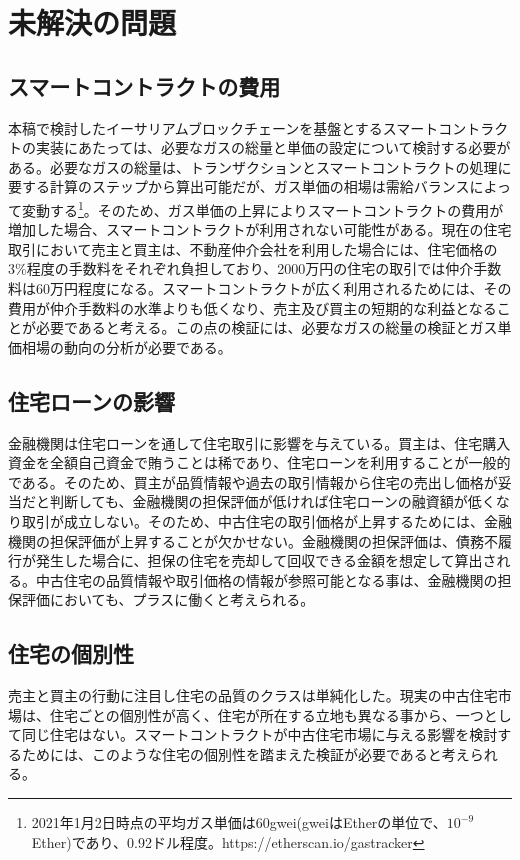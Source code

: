 \documentclass[a4paper,fontsize=11pt,report,notitlepage,line_length=38zw,number_of_lines=40,dvipdfmx]{jlreq}
\begin{document}
\section{未解決の問題}
\subsection{スマートコントラクトの費用}
本稿で検討したイーサリアムブロックチェーンを基盤とするスマートコントラクトの実装にあたっては、必要なガスの総量と単価の設定について検討する必要がある。必要なガスの総量は、トランザクションとスマートコントラクトの処理に要する計算のステップから算出可能だが、ガス単価の相場は需給バランスによって変動する\footnote{2021年1月2日時点の平均ガス単価は60gwei(gweiはEtherの単位で、$10^{-9}$Ether)であり、0.92ドル程度。https://etherscan.io/gastracker}。そのため、ガス単価の上昇によりスマートコントラクトの費用が増加した場合、スマートコントラクトが利用されない可能性がある。現在の住宅取引において売主と買主は、不動産仲介会社を利用した場合には、住宅価格の3\%程度の手数料をそれぞれ負担しており、2000万円の住宅の取引では仲介手数料は60万円程度になる。スマートコントラクトが広く利用されるためには、その費用が仲介手数料の水準よりも低くなり、売主及び買主の短期的な利益となることが必要であると考える。この点の検証には、必要なガスの総量の検証とガス単価相場の動向の分析が必要である。

\subsection{住宅ローンの影響}
金融機関は住宅ローンを通して住宅取引に影響を与えている。買主は、住宅購入資金を全額自己資金で賄うことは稀であり、住宅ローンを利用することが一般的である。そのため、買主が品質情報や過去の取引情報から住宅の売出し価格が妥当だと判断しても、金融機関の担保評価が低ければ住宅ローンの融資額が低くなり取引が成立しない。そのため、中古住宅の取引価格が上昇するためには、金融機関の担保評価が上昇することが欠かせない。金融機関の担保評価は、債務不履行が発生した場合に、担保の住宅を売却して回収できる金額を想定して算出される。中古住宅の品質情報や取引価格の情報が参照可能となる事は、金融機関の担保評価においても、プラスに働くと考えられる。

\subsection{住宅の個別性}
売主と買主の行動に注目し住宅の品質のクラスは単純化した。現実の中古住宅市場は、住宅ごとの個別性が高く、住宅が所在する立地も異なる事から、一つとして同じ住宅はない。スマートコントラクトが中古住宅市場に与える影響を検討するためには、このような住宅の個別性を踏まえた検証が必要であると考えられる。




\end{document}
